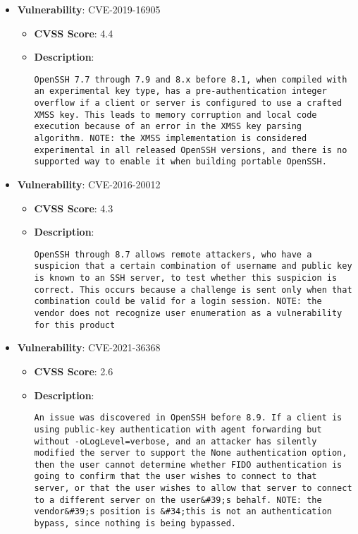 \documentclass{article}
\begin{document}
\begin{itemize}
    
        \item \textbf{Vulnerability}: CVE-2019-16905
        \begin{itemize}
            \item \textbf{CVSS Score}:  4.4 
            \item \textbf{Description}:
            \parbox[t]{0.9\linewidth}{
                \verb|OpenSSH 7.7 through 7.9 and 8.x before 8.1, when compiled with an experimental key type, has a pre-authentication integer overflow if a client or server is configured to use a crafted XMSS key. This leads to memory corruption and local code execution because of an error in the XMSS key parsing algorithm. NOTE: the XMSS implementation is considered experimental in all released OpenSSH versions, and there is no supported way to enable it when building portable OpenSSH.|
            }
        \end{itemize}
    
        \item \textbf{Vulnerability}: CVE-2016-20012
        \begin{itemize}
            \item \textbf{CVSS Score}:  4.3 
            \item \textbf{Description}:
            \parbox[t]{0.9\linewidth}{
                \verb|OpenSSH through 8.7 allows remote attackers, who have a suspicion that a certain combination of username and public key is known to an SSH server, to test whether this suspicion is correct. This occurs because a challenge is sent only when that combination could be valid for a login session. NOTE: the vendor does not recognize user enumeration as a vulnerability for this product|
            }
        \end{itemize}
    
        \item \textbf{Vulnerability}: CVE-2021-36368
        \begin{itemize}
            \item \textbf{CVSS Score}:  2.6 
            \item \textbf{Description}:
            \parbox[t]{0.9\linewidth}{
                \verb|An issue was discovered in OpenSSH before 8.9. If a client is using public-key authentication with agent forwarding but without -oLogLevel=verbose, and an attacker has silently modified the server to support the None authentication option, then the user cannot determine whether FIDO authentication is going to confirm that the user wishes to connect to that server, or that the user wishes to allow that server to connect to a different server on the user&#39;s behalf. NOTE: the vendor&#39;s position is &#34;this is not an authentication bypass, since nothing is being bypassed.|
            }
        \end{itemize}
    

\end{itemize}
\end{document}
